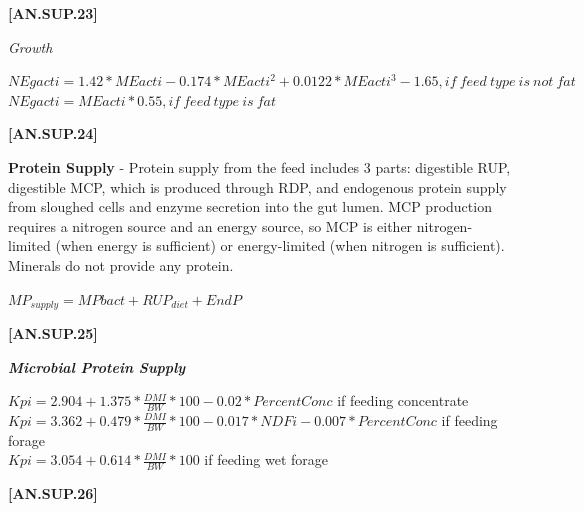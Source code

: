 \documentclass{article}
\begin{document}
\begin{refsection}
            {\raggedleft \textbf{[AN.SUP.23]}\par}
            \vspace{0.5cm}
            
\textit{Growth}
    \begin{center}
    \(NEgacti = 1.42 * MEacti - 0.174 * MEacti^{2} + 0.0122 * MEacti^{3} - 1.65, if\ feed\ type\ is\ not\ fat \)
    \(NEgacti = MEacti * 0.55, if\ feed\ type\ is\ fat \)
    \end{center}
    \vspace{0.5cm}
    
            {\raggedleft \textbf{[AN.SUP.24]}\par}
            \vspace{0.5cm}

    \textbf{ Protein Supply} - Protein supply from the feed includes 3 parts: digestible RUP, digestible MCP, which is produced through RDP, and endogenous protein supply from sloughed cells and enzyme secretion into the gut lumen. MCP production requires a nitrogen source and an energy source, so MCP is either nitrogen-limited (when energy is sufficient) or energy-limited (when nitrogen is sufficient). Minerals do not provide any protein.
    \vspace{0.2cm}

    \begin{center}
    \(MP_{supply} = MPbact + RUP_{diet} + EndP\)
    \end{center}
    \vspace{0.5cm}
    
            {\raggedleft \textbf{[AN.SUP.25]}\par}
            \vspace{0.5cm}

    \textbf{\textit{Microbial Protein Supply}} 
    \vspace{0.25cm}

    \begin{center}
    \(Kpi = 2.904 + 1.375 * \frac{DMI}{BW} * 100 - 0.02 * PercentConc\) if feeding concentrate\\
    \(Kpi = 3.362 + 0.479  * \frac{DMI}{BW} * 100 - 0.017 * NDFi - 0.007 * PercentConc\) if feeding forage\\
    \(Kpi = 3.054 + 0.614  * \frac{DMI}{BW} * 100\) if feeding wet forage
    \end{center}
    \vspace{0.5cm}
    
            {\raggedleft \textbf{[AN.SUP.26]}\par}
            \vspace{0.5cm}


\end{refsection}
\end{document}
